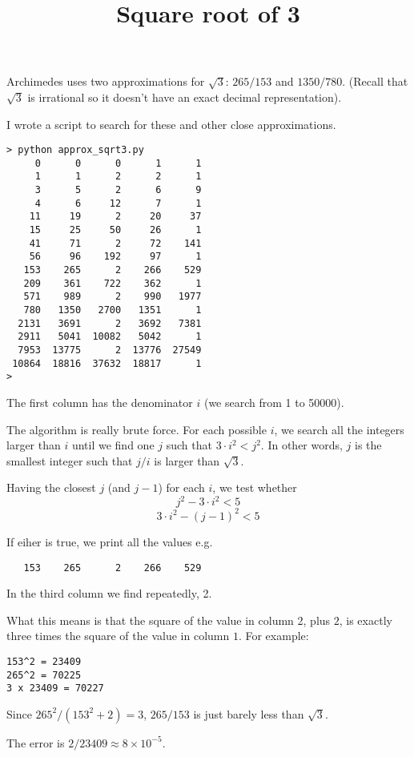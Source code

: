 \documentclass[11pt, oneside]{article}
\title{Square root of 3}
\date{}
\begin{document}
\maketitle
\Large
Archimedes uses two approximations for $\sqrt{3}$:  $265/153$  and $1350/780$. (Recall that $\sqrt{3}$ is irrational so it doesn't have an exact decimal representation). 

I wrote a script to search for these and other close approximations.

\begin{verbatim}
> python approx_sqrt3.py 
     0      0      0      1      1
     1      1      2      2      1
     3      5      2      6      9
     4      6     12      7      1
    11     19      2     20     37
    15     25     50     26      1
    41     71      2     72    141
    56     96    192     97      1
   153    265      2    266    529
   209    361    722    362      1
   571    989      2    990   1977
   780   1350   2700   1351      1
  2131   3691      2   3692   7381
  2911   5041  10082   5042      1
  7953  13775      2  13776  27549
 10864  18816  37632  18817      1
> 
\end{verbatim}
The first column has the denominator $i$ (we search from 1 to 50000).  

The algorithm is really brute force.  For each possible $i$, we search all the integers larger than $i$ until we find one $j$ such that $3 \cdot i^2 < j^2$.  In other words, $j$ is the smallest integer such that $j/i$ is larger than $\sqrt{3}$.  

Having the closest $j$ (and $j-1$) for each $i$, we test whether
\[ j^2 - 3 \cdot i^2 < 5 \]
\[ 3 \cdot i^2 - (j-1)^2 < 5 \]

If eiher is true, we print all the values e.g.
\begin{verbatim}
   153    265      2    266    529
\end{verbatim}

In the third column we find repeatedly, 2.  

What this means is that the square of the value in column 2, plus $2$, is exactly three times the square of the value in column $1$.  For example:

\begin{verbatim}
153^2 = 23409
265^2 = 70225
3 x 23409 = 70227
\end{verbatim}
Since $265^2 / (153^2 + 2) = 3$,  $265/153$ is just barely less than $\sqrt{3}$.

The error is $2/23409 \approx 8 \times 10^{-5}$.
\end{document}
